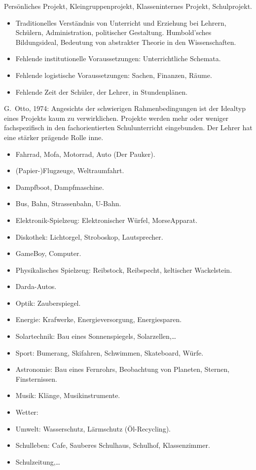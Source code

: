 Pers\"{o}nliches Projekt, Kleingruppenprojekt, Klasseninternes Projekt,
Schulprojekt.


\begin{itemize}
\item
Traditionelles Verst\"{a}ndnis von Unterricht und Erziehung bei Lehrern, Sch\"{u}lern,
Administration, politischer Gestaltung.
Humbold'sches Bildungsideal,
Bedeutung von abstrakter Theorie in den Wissenschaften.
\item
Fehlende institutionelle Voraussetzungen: Unterrichtliche Schemata.
\item
Fehlende logistische Voraussetzungen: Sachen, Finanzen, R\"{a}ume.
\item
Fehlende Zeit der Sch\"{u}ler, der Lehrer, in Stundenpl\"{a}nen.
\end{itemize}


G.\ Otto, 1974: Angesichts der schwierigen Rahmenbedingungen ist
der Idealtyp eines Projekts kaum zu verwirklichen.
Projekte werden mehr oder weniger fachspezifisch in den
fachorientierten Schulunterricht eingebunden.
Der Lehrer hat eine st\"{a}rker pr\"{a}gende Rolle inne.



\begin{itemize}
\item
Fahrrad, Mofa, Motorrad, Auto (Der Pauker).
\item
(Papier-)Flugzeuge, Weltraumfahrt.
\item
Dampfboot, Dampfmaschine.
\item
Bus, Bahn, Strassenbahn, U-Bahn.
\item
Elektronik-Spielzeug: Elektronischer W\"{u}rfel, MorseApparat.
\item
Diskothek: Lichtorgel, Stroboskop, Lautsprecher.
\item
GameBoy, Computer.
\item
Physikalisches Spielzeug:
Reibstock, Reibspecht, keltischer Wackelstein.
\item
Darda-Autos.
\item
Optik: Zauberspiegel.
\item
Energie: Krafwerke, Energieversorgung, Energiesparen.
\item
Solartechnik: Bau eines Sonnenspiegels, Solarzellen,\dots
\item
Sport: Bumerang, Skifahren, Schwimmen, Skateboard, W\"{u}rfe.
\item
Astronomie:
Bau eines Fernrohrs, Beobachtung von Planeten, Sternen,
Finsternissen.
\item
Musik: Kl\"{a}nge, Musikinstrumente.
\item
Wetter:
\item
Umwelt: Wasserschutz, L\"{a}rmschutz (\"{O}l-Recycling).
\item
Schulleben: Cafe, Sauberes Schulhaus, Schulhof, Klassenzimmer.
\item
Schulzeitung,\dots
\end{itemize}


